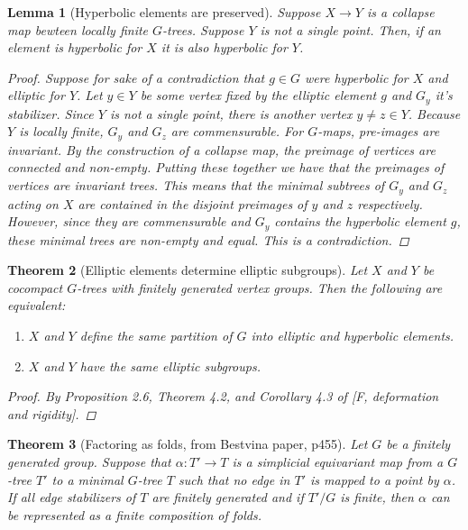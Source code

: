\documentclass{article}
\theoremstyle{mystyle}
\newtheorem{thm}{Theorem}[section]
\newtheorem{lem}[thm]{Lemma}
\theoremstyle{remark}
\begin{document}
\begin{lem}
    [Hyperbolic elements are preserved]
    \label{lem:promoteelliptic} 
    Suppose \(X \to Y\) is a collapse map bewteen locally finite \(G\)-trees. Suppose \(Y\) is not a single point. Then, if an element is hyperbolic for \(X\) it is also hyperbolic for \(Y\).
    \begin{proof}
        Suppose for sake of a contradiction that \(g\in G\) were hyperbolic for \(X\) and elliptic for \(Y\). Let \(y \in Y\) be some vertex fixed by the elliptic element \(g\) and \(G_y\) it's stabilizer. Since \(Y\) is not a single point, there is another vertex \(y\neq z \in Y\). Because \(Y\) is locally finite, \(G_y\) and \(G_z\) are commensurable. For \(G\)-maps, pre-images are invariant. By the construction of a collapse map, the preimage of vertices are connected and non-empty. Putting these together we have that the preimages of vertices are invariant trees. This means that the minimal subtrees of \(G_y\) and \(G_z\) acting on \(X\) are contained in the disjoint preimages of \(y\) and \(z\) respectively. However, since they are commensurable and \(G_y\) contains the hyperbolic element \(g\), these minimal trees are non-empty and equal. This is a contradiction.
    \end{proof}
\end{lem}

\begin{thm}
    [Elliptic elements determine elliptic subgroups]
    \label{thm:ellelesubgroups} 
    Let \(X\) and \(Y\) be cocompact \(G\)-trees with finitely generated vertex groups. Then the following are equivalent:
    \begin{enumerate}
        \item \(X\) and \(Y\) define the same partition of \(G\) into elliptic and hyperbolic elements.
        \item \(X\) and \(Y\) have the same elliptic subgroups.
    \end{enumerate}

    \begin{proof}
    By Proposition 2.6, Theorem 4.2, and Corollary 4.3 of [F, deformation and rigidity].
    \end{proof}
    
\end{thm}

\begin{thm}[Factoring as folds, from Bestvina paper, p455]
    \label{thm:folds} 
Let $G$ be a finitely generated group. Suppose that $\alpha: T'\to T$ is a simplicial equivariant map from a $G$-tree $T'$ to a minimal $G$-tree $T$ such that no edge in $T'$ is mapped to a point by $\alpha$. If all edge stabilizers of $T$ are finitely generated and if $T'/G$ is finite, then $\alpha$ can be represented as a finite composition of folds.
\end{thm}
\end{document}
